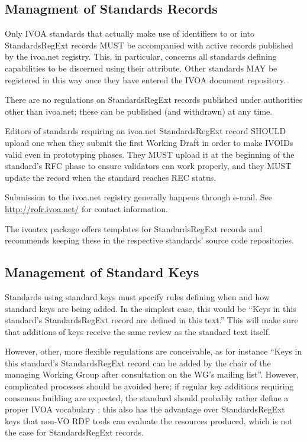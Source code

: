 \documentclass[11pt,a4paper]{ivoa}
\begin{document}
\subsection{Managment of Standards Records}

Only IVOA standards that actually make use of identifiers to or into
StandardsRegExt records MUST be accompanied with active records
published by the ivoa.net registry.  This, in particular, concerns all
standards defining capabilities to be discerned using their
 attribute.  Other standards MAY be registered in this
way once they have entered the IVOA document repository.

There are no regulations on StandardsRegExt records published under
authorities other than ivoa.net; these can be published (and withdrawn)
at any time.

Editors of standards requiring an ivoa.net StandardsRegExt record SHOULD
upload one when they submit the first Working Draft in order to make
IVOIDs valid even in prototyping phases.  They MUST upload it at the
beginning of the standard's RFC phase to ensure validators can work
properly, and they MUST update the record when the standard reaches REC
status.

Submission to the ivoa.net registry generally happens through e-mail.
See \url{http://rofr.ivoa.net/} for contact information.

The ivoatex package \citep{ivoatexDoc} offers templates for
StandardsRegExt records and recommends keeping these in the respective
standards' source code repositories.


\subsection{Management of Standard Keys}

Standards using standard keys must specify rules defining when and how
standard  keys are being added.  In the simplest case, this would be
``Keys in this standard's StandardsRegExt record are defined in this
text.''  This will make sure that additions of keys receive the same
review as the standard text itself.

However, other, more flexible regulations are conceivable, as for
instance ``Keys in this standard's StandardsRegExt record can be added
by the chair of the managing Working Group after consultation on the
WG's mailing list''.  However, complicated processes should be avoided
here; if regular key additions requiring consensus building are
expected, the standard should probably rather define a proper IVOA
vocabulary \citep{2021ivoa.spec.0525D}; this also has the advantage over
StandardsRegExt keys that non-VO RDF tools can evaluate the resources
produced, which is not the case for StandardsRegExt records.
\end{document}
